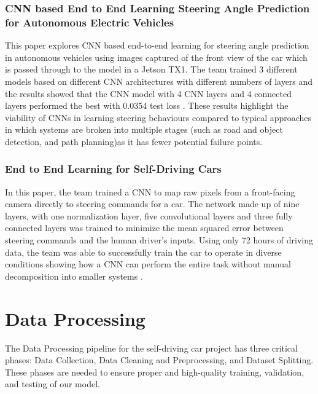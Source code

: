 \documentclass{article} %
\begin{document}
\subsubsection{CNN based End to End Learning Steering Angle Prediction for Autonomous Electric Vehicles \citep{Mygapula2021}}

This paper explores CNN based end-to-end learning for steering angle prediction in autonomous vehicles using images captured of the front 
view of the car which is passed through to the model in a Jetson TX1. The team trained 3 different models based on different CNN architectures 
with different numbers of layers and the results showed that the CNN model with 4 CNN layers and 4 connected layers performed the 
best with 0.0354 test loss \citep{Mygapula2021}. These results highlight the viability of CNNs in learning steering behaviours compared to typical 
approaches in which systems are broken into multiple stages (such as road and object detection, and path planning)as it has fewer potential failure points.

\subsubsection{End to End Learning for Self-Driving Cars \citep{bojarski2016endendlearningselfdriving}}

In this paper, the team trained a CNN to map raw pixels from a front-facing camera directly to steering commands for a car. 
The network made up of nine layers, with one normalization layer, five convolutional layers and three fully connected layers 
was trained to minimize the mean squared error between steering commands and the human driver’s inputs. Using only 
72 hours of driving data, the team was able to successfully train the car to operate in diverse conditions showing 
how a CNN can perform the entire task without manual decomposition into smaller systems \citep{bojarski2016endendlearningselfdriving}. 

\section{Data Processing}
\label{headings}


The Data Processing pipeline for the self-driving car project has three critical phases:
Data Collection, Data Cleaning and Preprocessing, and Dataset Splitting. These phases are
needed to ensure proper and high-quality training, validation, and testing of our model.
\end{document}
